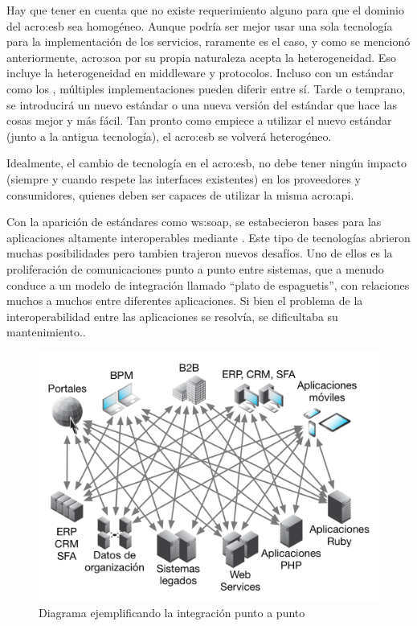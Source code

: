 Hay que tener en cuenta que no existe requerimiento alguno para que el dominio del \gls{acro:esb} sea homogéneo. Aunque podría ser mejor usar una sola tecnología para la implementación de los servicios, raramente es el caso, y como se mencionó anteriormente, \gls{acro:soa} por su propia naturaleza acepta la heterogeneidad. Eso incluye la heterogeneidad en middleware y protocolos. Incluso con un estándar como los , múltiples implementaciones pueden diferir entre sí. Tarde o temprano, se introducirá un nuevo estándar o una nueva versión del estándar que hace las cosas mejor y más fácil. Tan pronto como empiece a utilizar el nuevo estándar (junto a la antigua tecnología), el \gls{acro:esb} se volverá heterogéneo\cite[p.~49]{josuttis2007}.

Idealmente, el cambio de tecnología en el \gls{acro:esb}, no debe tener ningún impacto (siempre y cuando respete las interfaces existentes) en los proveedores y consumidores, quienes deben ser capaces de utilizar la misma \gls{acro:api}.

Con la aparición de estándares como \gls{ws:soap}, se estabecieron bases para las aplicaciones altamente interoperables mediante . Este tipo de tecnologías abrieron muchas posibilidades pero tambien trajeron nuevos desafíos. Uno de ellos es la proliferación de comunicaciones punto a punto entre sistemas, que a menudo conduce a un modelo de integración llamado ``plato de espaguetis'', con relaciones muchos a muchos entre diferentes aplicaciones. Si bien el problema de la interoperabilidad entre las aplicaciones se resolvía, se dificultaba su mantenimiento.\cite[p.~4]{dossotandemic2010}.

\begin{figure}[H]
  \includegraphics[width=\linewidth]{src/images/03-capitulo-3/tecnologias/esb/integracion-p2p.png}
  \caption{Diagrama ejemplificando la integración punto a punto}
  \label{fig:point-to-point-integration}
\end{figure}


